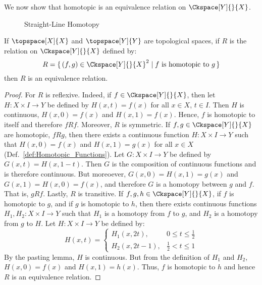 \documentclass{article}                                                        %
\begin{document}
        We now show that homotopic is an equivalence relation on
        $\Ckspace[Y]{}{X}$.
        \begin{figure}[H]
            \centering
            \captionsetup{type=figure}
            
            \caption{Straight-Line Homotopy}
            \label{fig:straight_line_homotopy}
        \end{figure}
        \begin{theorem}
            If $\topspace[X]{X}$ and $\topspace[Y]{Y}$ are topological spaces,
            if $R$ is the relation on $\Ckspace[Y]{}{X}$ defined by:
            \begin{equation}
                R=\{\,(f,g)\in\Ckspace[Y]{}{X}^{2}\;|\;
                    f\textrm{ is homotopic to }g\,\}
            \end{equation}
            then $R$ is an equivalence relation.
        \end{theorem}
        \begin{proof}
            For $R$ is reflexive. Indeed, if $f\in\Ckspace[Y]{}{X}$, then let
            $H:X\times{I}\rightarrow{Y}$ be defined by $H(x,t)=f(x)$ for all
            $x\in{X}$, $t\in{I}$. Then $H$ is continuous, $H(x,0)=f(x)$ and
            $H(x,1)=f(x)$. Hence, $f$ is homotopic to itself and therefore
            $fRf$. Moreover, $R$ is symmetric. If $f,g\in\Ckspace[Y]{}{X}$ are
            homotopic, $fRg$, then there exists a continuous function
            $H:X\times{I}\rightarrow{Y}$ such that $H(x,0)=f(x)$ and
            $H(x,1)=g(x)$ for all $x\in{X}$
            (Def.~\ref{def:Homotopic_Functions}). Let
            $G:X\times{I}\rightarrow{Y}$ be defined by
            $G(x,t)=H(x,1-t)$. Then $G$ is the composition of continuous
            functions and is therefore continuous. But moreoever,
            $G(x,0)=H(x,1)=g(x)$ and $G(x,1)=H(x,0)=f(x)$, and therefore
            $G$ is a homotopy between $g$ and $f$. That is, $gRf$. Lastly, $R$
            is transitive. If $f,g,h\in\Ckspace[Y]{}{X}$, if $f$ is homotopic to
            $g$, and if $g$ is homotopic to $h$, then there exists continuous
            functions $H_{1},H_{2}:X\times{I}\rightarrow{Y}$ such that $H_{1}$
            is a homotopy from $f$ to $g$, and $H_{2}$ is a homotopy from $g$ to
            $H$. Let $H:X\times{I}\rightarrow{Y}$ be defined by:
            \begin{equation}
                H(x,t)=
                \begin{cases}
                    H_{1}(x,2t),&{0}\leq{t}\leq\frac{1}{2}\\
                    H_{2}(x,2t-1),&\frac{1}{2}<{t}\leq{1}
                \end{cases}
            \end{equation}
            By the pasting lemma, $H$ is continuous. But from the definition of
            $H_{1}$ and $H_{2}$, $H(x,0)=f(x)$ and $H(x,1)=h(x)$. Thus,
            $f$ is homotopic to $h$ and hence $R$ is an equivalence relation.
        \end{proof}
\end{document}
